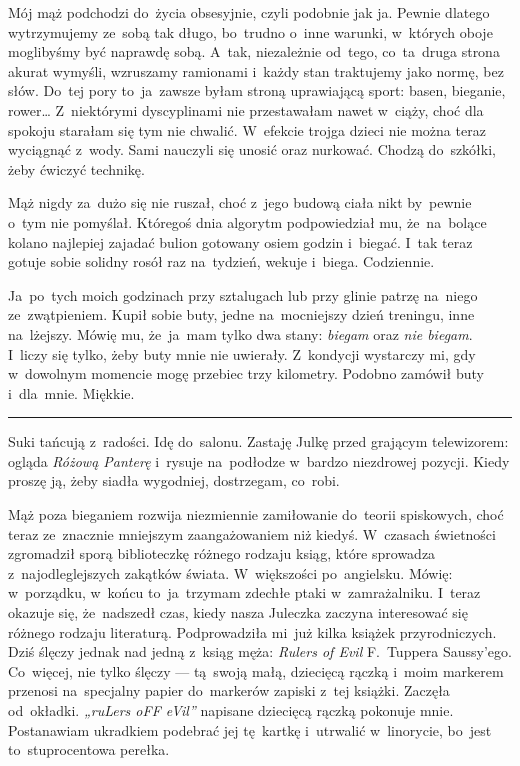 \documentclass[9pt, a5paper]{memoir}
\begin{document}
Mój mąż podchodzi do~życia obsesyjnie, czyli podobnie jak ja. Pewnie dlatego wytrzymujemy ze~sobą tak długo, bo~trudno o~inne warunki, w~których oboje moglibyśmy być naprawdę sobą. A~tak, niezależnie od~tego, co~ta~druga strona akurat wymyśli, wzruszamy ramionami i~każdy stan traktujemy jako normę, bez słów. Do~tej pory to~ja~zawsze byłam stroną uprawiającą sport: basen, bieganie, rower\dots{} Z~niektórymi dyscyplinami nie przestawałam nawet w~ciąży, choć dla spokoju starałam się tym nie chwalić. W~efekcie trojga dzieci nie można teraz wyciągnąć z~wody. Sami nauczyli się unosić oraz nurkować. Chodzą do~szkółki, żeby ćwiczyć technikę.

Mąż nigdy za~dużo się nie ruszał, choć z~jego budową ciała nikt by~pewnie o~tym nie pomyślał. Któregoś dnia algorytm podpowiedział mu, że~na~bolące kolano najlepiej zajadać bulion gotowany osiem godzin i~biegać. I~tak teraz gotuje sobie solidny rosół raz na~tydzień, wekuje i~biega. Codziennie.

Ja~po~tych moich godzinach przy sztalugach lub przy glinie patrzę na~niego ze~zwątpieniem. Kupił sobie buty, jedne na~mocniejszy dzień treningu, inne na~lżejszy. Mówię mu, że~ja~mam tylko dwa stany: \textit{biegam} oraz \textit{nie biegam}. I~liczy się tylko, żeby buty mnie nie uwierały. Z~kondycji wystarczy mi, gdy w~dowolnym momencie mogę przebiec trzy kilometry. Podobno zamówił buty i~dla~mnie. Miękkie.

\fancybreak{* \quad * \quad *}

Suki tańcują z~radości. Idę do~salonu. Zastaję Julkę przed grającym telewizorem: ogląda \textit{Różową Panterę} i~rysuje na~podłodze w~bardzo niezdrowej pozycji. Kiedy proszę ją, żeby siadła wygodniej, dostrzegam, co~robi.

Mąż poza bieganiem rozwija niezmiennie zamiłowanie do~teorii spiskowych, choć teraz ze~znacznie mniejszym zaangażowaniem niż kiedyś. W~czasach świetności zgromadził sporą biblioteczkę różnego rodzaju ksiąg, które sprowadza z~najodleglejszych zakątków świata. W~większości po~angielsku. Mówię: w~porządku, w~końcu to~ja~trzymam zdechłe ptaki w~zamrażalniku. I~teraz okazuje się, że~nadszedł czas, kiedy nasza Juleczka zaczyna interesować się różnego rodzaju literaturą. Podprowadziła mi~już kilka książek przyrodniczych. Dziś ślęczy jednak nad jedną z~ksiąg męża: \textit{Rulers of Evil} F.~Tuppera Saussy'ego. Co~więcej, nie tylko ślęczy --- tą~swoją małą, dziecięcą rączką i~moim markerem przenosi na~specjalny papier do~markerów zapiski z~tej książki. Zaczęła od~okładki. \textit{„ruLers oFF eVil”} napisane dziecięcą rączką pokonuje mnie. Postanawiam ukradkiem podebrać jej tę~kartkę i~utrwalić w~linorycie, bo~jest to~stuprocentowa perełka.
\end{document}
